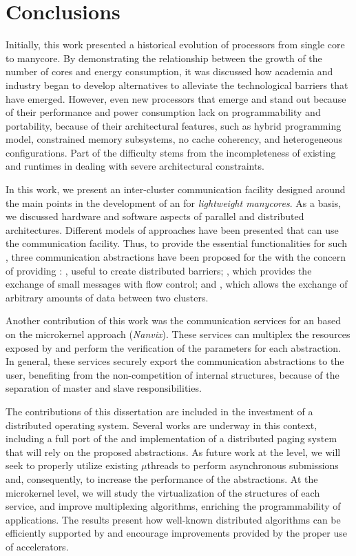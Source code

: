 \chapter{Conclusions}
\label{ch.conclusions}

	Initially, this work presented a historical evolution of processors from single core
    to manycore. By demonstrating the relationship between the growth of the
    number of cores and energy consumption, it was discussed how academia and
    industry began to develop alternatives to alleviate the technological barriers
    that have emerged. However, even new processors that emerge and stand out
    because of their performance and power consumption lack on programmability
    and portability, because of their architectural features, such as hybrid
    programming model, constrained memory subsystems, no cache coherency, and
    heterogeneous configurations. Part of the difficulty stems from the
    incompleteness of existing \oss and runtimes in dealing with severe
    architectural constraints.

	In this work, we present an inter-cluster communication facility designed
    around the main points in the development of an \os for
    \textit{lightweight manycores}. As a basis, we discussed hardware and software
    aspects of parallel and distributed architectures. Different models of \os
    approaches have been presented that can use the communication facility.
    Thus, to provide the essential functionalities for such \oss, three
    communication abstractions have been proposed for the \nanvixhal with the concern of
    providing \qos: \sync, useful to create distributed
    barriers; \mailbox, which provides the exchange of small messages
    with flow control; and \portal, which allows the exchange
    of arbitrary amounts of data between two clusters.

	Another contribution of this work was the communication services for an \os
    based on the microkernel approach (\textit{Nanvix}). These services can multiplex
    the resources exposed by \hal and perform the verification of the parameters for
    each abstraction. In general, these services securely export the communication
    abstractions to the user, benefiting from the non-competition of \os internal
    structures, because of the separation of master and slave responsibilities.

	The contributions of this dissertation are included in the investment of a
    distributed operating system. Several works are underway in this context,
    including a full port of the \mpi and implementation of a distributed paging
    system that will rely on the proposed abstractions. As future work at the \hal level, we will
    seek to properly utilize existing \dma $\mu$threads to perform asynchronous
    submissions and, consequently, to increase the performance of the abstractions. At
    the microkernel level, we will study the virtualization of the structures of
    each service, and improve multiplexing algorithms, enriching the
    programmability of applications. The results present how well-known
    distributed algorithms can be efficiently supported by \nanvixos and
    encourage improvements provided by the proper use of \dma accelerators.